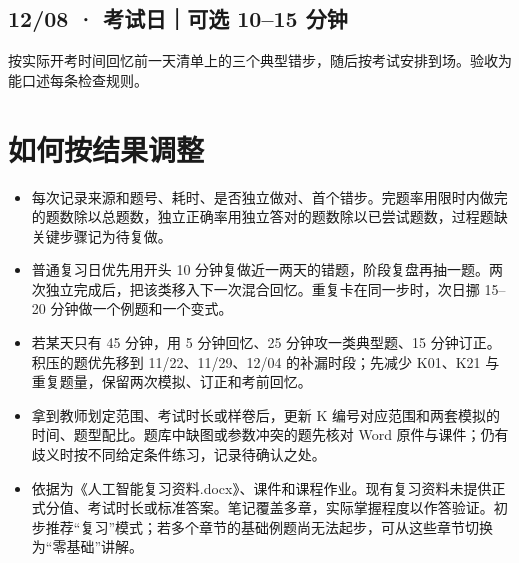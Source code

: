 \documentclass[UTF8,a4paper,11pt]{ctexart}
\begin{document}
\subsection{12/08 · 考试日｜可选 10–15 分钟}
按实际开考时间回忆前一天清单上的三个典型错步，随后按考试安排到场。验收为能口述每条检查规则。

\section{如何按结果调整}
\begin{itemize}
\item 每次记录来源和题号、耗时、是否独立做对、首个错步。完题率用限时内做完的题数除以总题数，独立正确率用独立答对的题数除以已尝试题数，过程题缺关键步骤记为待复做。
\item 普通复习日优先用开头 10 分钟复做近一两天的错题，阶段复盘再抽一题。两次独立完成后，把该类移入下一次混合回忆。重复卡在同一步时，次日挪 15–20 分钟做一个例题和一个变式。
\item 若某天只有 45 分钟，用 5 分钟回忆、25 分钟攻一类典型题、15 分钟订正。积压的题优先移到 11/22、11/29、12/04 的补漏时段；先减少 K01、K21 与重复题量，保留两次模拟、订正和考前回忆。
\item 拿到教师划定范围、考试时长或样卷后，更新 K 编号对应范围和两套模拟的时间、题型配比。题库中缺图或参数冲突的题先核对 Word 原件与课件；仍有歧义时按不同给定条件练习，记录待确认之处。
\item 依据为《人工智能复习资料.docx》、课件和课程作业。现有复习资料未提供正式分值、考试时长或标准答案。笔记覆盖多章，实际掌握程度以作答验证。初步推荐“复习”模式；若多个章节的基础例题尚无法起步，可从这些章节切换为“零基础”讲解。
\end{itemize}
\end{document}
